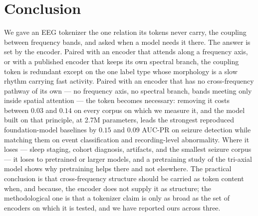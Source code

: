 \section{Conclusion}
\label{sec:conclusion}

We gave an EEG tokenizer the one relation its tokens never carry, the
coupling between frequency bands, and asked when a model needs it there.
The answer is set by the encoder. Paired with an encoder that attends
along a frequency axis, or with a published encoder that keeps its own
spectral branch, the coupling token is redundant except on the one label
type whose morphology is a slow rhythm carrying fast activity. Paired
with an encoder that has no cross-frequency pathway of its own --- no
frequency axis, no spectral branch, bands meeting only inside spatial
attention --- the token becomes necessary: removing it costs between
$0.03$ and $0.14$ on every corpus on which we measure it, and the model
built on that principle, at 2.7M parameters, leads the strongest
reproduced foundation-model baselines by $0.15$ and $0.09$ AUC-PR on
seizure detection while matching them on event classification and
recording-level abnormality. Where it loses --- sleep staging, cohort
diagnosis, artifacts, and the smallest seizure corpus --- it loses to
pretrained or larger models, and a pretraining study of the tri-axial
model shows why pretraining helps there and not elsewhere. The practical
conclusion is that cross-frequency structure should be carried as token
content when, and because, the encoder does not supply it as structure;
the methodological one is that a tokenizer claim is only as broad as the
set of encoders on which it is tested, and we have reported ours across
three.
